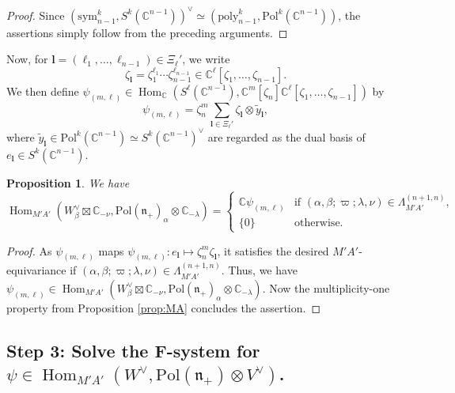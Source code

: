 \documentclass[reqno,11pt]{amsart}
\newtheorem{prop}[equation]{Proposition}
\theoremstyle{remark}
\theoremstyle{definition}
\numberwithin{equation}{section}
\newcommand{\gb}{\beta}
\newcommand{\ga}{\alpha}
\newcommand{\gL}{\Lambda}
\newcommand{\fn}{{\mathfrak n}}
\newcommand{\C}{\mathbb{C}}
\newcommand{\Hom}{\operatorname{Hom}}
\newcommand{\Pol}{\mathrm{Pol}}
\newcommand{\poly}{\mathrm{poly}}
\newcommand{\sym}{\mathrm{sym}}
\begin{document}
\begin{proof}
Since $(\sym_{n-1}^k, S^k(\C^{n-1}))^\vee \simeq (\poly_{n-1}^k,\Pol^k(\C^{n-1}))$,
the assertions simply follow from the preceding arguments.
\end{proof}

Now, for $\mathbf{l}=(\ell_1, \ldots, \ell_{n-1}) \in \Xi_\ell'$,  we write
\begin{equation*}
\zeta_{\mathbf{l}}= \zeta_1^{\ell_1} \cdots \zeta_{n-1}^{\ell_{n-1}}
\in \C^\ell[\zeta_1,\ldots, \zeta_{n-1}].
\end{equation*}
We then define 
$\psi_{(m,\ell)} \in 
\Hom_\C(S^\ell(\C^{n-1}),\C^m[\zeta_n] \C^\ell[\zeta_1,\ldots, \zeta_{n-1}])$ by
\begin{equation}\label{eqn:psi}
\psi_{(m,\ell)} = 
\zeta_n^m\sum_{\mathbf{l}\in \Xi_\ell'}
\zeta_{\mathbf{l}} \otimes \widetilde{y}_{\mathbf{l}},
\end{equation}
where $\widetilde{y}_{\mathbf{l}}\in \Pol^k(\C^{n-1})\simeq S^k(\C^{n-1})^\vee$ are regarded as 
the dual basis of $e_{\mathbf{l}} \in S^k(\C^{n-1})$.


\begin{prop}\label{prop:sym}
We have
\begin{equation*}
\Hom_{M'A'}(W_{\beta}^\vee\boxtimes \C_{-\nu}, 
\Pol(\fn_+)_{\alpha}\otimes \C_{-\lambda})=
\begin{cases}
\C \psi_{(m,\ell)} & \text{if 
$(\ga,\gb;\varpi;\lambda,\nu) \in \gL^{(n+1,n)}_{M'A'}$,}\\
\{0\} & \text{otherwise.}
\end{cases}
\end{equation*}
\end{prop}

\begin{proof}
As $\psi_{(m,\ell)}$ maps 
$\psi_{(m,\ell)}\colon e_{\mathbf{l}} \mapsto \zeta_n^m \zeta_{\mathbf{l}}$,
it satisfies the desired $M'A'$-equivariance if 
$(\ga,\gb;\varpi;\lambda,\nu) \in \gL^{(n+1,n)}_{M'A'}$.
Thus, we have
$\psi_{(m,\ell)} \in \Hom_{M'A'}(W_{\beta}^\vee\boxtimes \C_{-\nu}, 
\Pol(\fn_+)_{\alpha}\otimes \C_{-\lambda})$.
Now the multiplicity-one property from Proposition \ref{prop:MA} concludes
the assertion.
\end{proof}


\subsection{Step 3: 
Solve the F-system
for $\psi \in \Hom_{M'A'}(W^\vee, \Pol(\fn_+)\otimes V^\vee)$.
}
\end{document}
